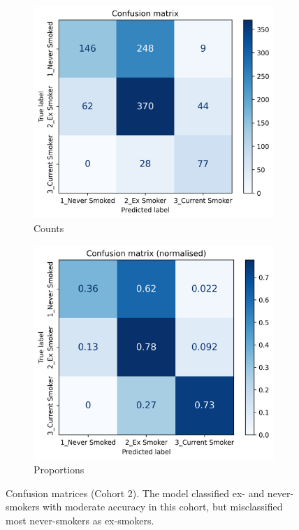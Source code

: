 \documentclass[draft]{article} %
\begin{document}
\begin{figure}[p]
    \centering
    \begin{subfigure}{0.49\linewidth}
        \centering
        \includegraphics[width=\linewidth]{cohort2/test_confusion_matrix.png}
        \caption{Counts}
    \end{subfigure}
    \hfill
    \begin{subfigure}{0.49\linewidth}
        \centering
        \includegraphics[width=\linewidth]{cohort2/test_confusion_matrix_normalised.png}
        \caption{Proportions}
    \end{subfigure}
    \caption[Confusion matrices (Cohort 2)]{Confusion matrices (Cohort 2). The model classified ex- and never-smokers with moderate accuracy in this cohort, but misclassified most never-smokers as ex-smokers.}
    \label{fig:cohort2-confusion-matrix}
\end{figure}
\end{document}
